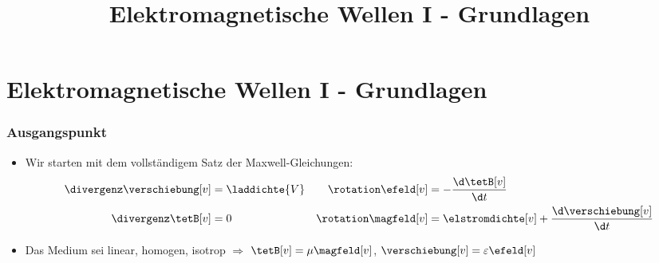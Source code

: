 
  
\title[TET: Elektromagnetische Wellen I - Grundlagen]{Elektromagnetische Wellen I - Grundlagen}


% 
% 

\maketitle

% 
% 
\section{Elektromagnetische Wellen I - Grundlagen}

\begin{frame}
  \frametitle{Ausgangspunkt}
  \begin{itemize}[<+->]
  \item Wir starten mit dem vollständigem Satz der Maxwell-Gleichungen:
\begin{align*}
\divergenz \verschiebung[v] &= \laddichte{V} & \rotation \efeld[v] &= -\frac{\d \tetB[v]}{\d t}\\
\divergenz \tetB[v] &= 0 & \rotation \magfeld[v] &= \elstromdichte[v]+\frac{\d \verschiebung[v]}{\d t} 
\end{align*}
\item Das Medium sei \alert{linear, homogen, isotrop} \(\Rightarrow\) \(\tetB[v] = \mu \magfeld[v]\), \(\verschiebung[v]=\varepsilon\efeld[v]\)
  \end{itemize}
\end{frame}


